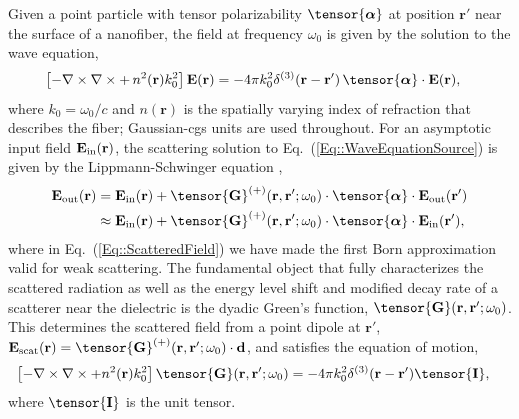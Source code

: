 \documentclass[preprint, aps,pra,onecolumn]{revtex4-1} %
\def\br{\mathbf{r}}
\newcommand{\erf}[1]{Eq.~(\ref{#1})}
\newcommand{\mbf}[1]{\mathbf{#1}}
\newcommand{\inp}{{\rm in}}
\newcommand{\out}{{\rm out}}
\newcommand{\unittens}{\tensor{\mathbf{I}}}
\begin{document}
Given a point particle with tensor polarizability $\tensor{\boldsymbol{\alpha}}$ at position $\br'$ near the surface of a nanofiber, the field  at frequency $\omega_0$ is given by the solution to the wave equation, 
	\begin{align}\label{Eq::WaveEquationSource}
		\left[ - \nabla\times\nabla\times + \, n^2(\br)k_0^2 \right] \mathbf{E}(\br) &= -4\pi  k_0^2 \delta^{(3)}(\br-\br')\,  \tensor{\boldsymbol{\alpha}}\cdot \mathbf{E}(\br),
	\end{align}
where $k_0=\omega_0/c$ and $n(\mbf{r})$ is the spatially varying index of refraction that describes the fiber; Gaussian-cgs units are used throughout.  
For an asymptotic input field $\mathbf{E}_{\inp}(\br)$, the scattering solution to \erf{Eq::WaveEquationSource} is given by the Lippmann-Schwinger equation \cite{wubs_multiple-scattering_2004},
\begin{subequations}
	\begin{align}
		\mathbf{E}_{\out}(\br) &=\mathbf{E}_{\inp}(\br)+\tensor{\mathbf{G}}^{(+)}(\br , \br'; \omega_0)\cdot 
\tensor{\boldsymbol{\alpha}}\cdot \mathbf{E}_{\out}(\br')\\
		&\approx \mathbf{E}_{\inp}(\br)+ \tensor{\mathbf{G}}^{(+)}(\br , \br'; \omega_0) \cdot 
\tensor{\boldsymbol{\alpha}}\cdot \mathbf{E}_{\inp}(\br'), \label{Eq::ScatteredField}
	\end{align}
\end{subequations}
where in \erf{Eq::ScatteredField} we have made the first Born approximation valid for weak scattering. The fundamental object that fully characterizes the scattered radiation as well as the energy level shift and modified decay rate of a scatterer near the dielectric is the dyadic Green's function, $\tensor{\mathbf{G}}(\br, \br';\omega_0)$. This determines the scattered field from a point dipole at $\br'$, $\mathbf{E}_{\rm scat}(\br)= \tensor{\mathbf{G}}^{(+)}(\br , \br'; \omega_0)\cdot \mathbf{d}$, and satisfies the equation of motion,
	\begin{align} \label{Eq::GreensDiffEq}
		\left[ -\nabla\times\nabla\times + n^2(\mbf{r}) k_0^2 \right] \tensor{\mathbf{G}}(\br, \br';\omega_0) &= -4\pi 
k_0^2 \delta^{(3)}(\mathbf{r}-\mathbf{r}') \unittens,
	\end{align}
where $\unittens$ is the unit tensor.   
\end{document}
